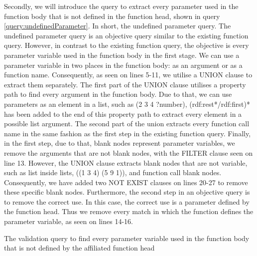 \para 
Secondly, we will introduce the query to extract every parameter used in the function body that is not defined in the function head, shown in query \ref{query:undefinedParameter}. In short, the undefined parameter query. The undefined parameter query is an objective query similar to the existing function query. However, in contrast to the existing function query, the objective is every parameter variable used in the function body in the first stage. We can use a parameter variable in two places in the function body: as an argument or as a function name. Consequently, as seen on lines 5-11, we utilise a UNION clause to extract them separately. The first part of the UNION clause utilises a property path to find every argument in the function body. Due to that, we can use parameters as an element in a list, such as (2 3 4 ?number), (rdf:rest*/rdf:first)* has been added to the end of this property path to extract every element in a possible list argument. The second part of the union extracts every function call name in the same fashion as the first step in the existing function query. Finally, in the first step, due to that, blank nodes represent parameter variables, we remove the arguments that are not blank nodes, with the FILTER clause seen on line 13. However, the UNION clause extracts blank nodes that are not variable, such as list inside lists, ((1 3 4) (5 9 1)), and function call blank nodes. Consequently, we have added two NOT EXIST clauses on lines 20-27 to remove these specific blank nodes. Furthermore, the second step in an objective query is to remove the correct use. In this case, the correct use is a parameter defined by the function head. Thus we remove every match in which the function defines the parameter variable, as seen on lines 14-16. 


\begin{query}
    The validation query to find every parameter variable used in the function body that is not defined by the affiliated function head 
    \label{query:argumentArity}
\end{query}


